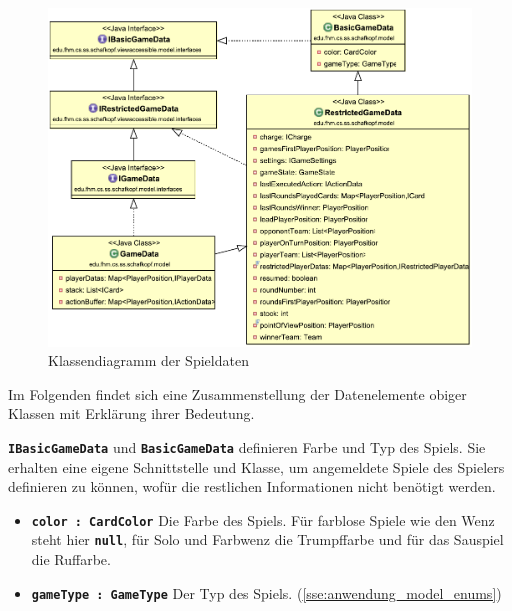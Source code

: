 \documentclass[
							a4paper, 
							11pt, 
							openany, 
							liststotoc,
							parskip=half, 
   							headings=normal
						]{scrreprt}
\begin{document}
{\begin{figure}[H]
\begin{center}
    \includegraphics[width=1.0\textwidth]{./pictures/uml/class_diagram/uml_class_gamedata.pdf}
	\caption[Anwendung/Model -- Klassendiagramm Spieldaten]{Klassendiagramm der Spieldaten} \label{fig:model_gamedata}
\end{center}
\end{figure}

Im Folgenden findet sich eine Zusammenstellung der Datenelemente obiger Klassen mit Erklärung ihrer Bedeutung.

\textbf{\texttt{IBasicGameData}} und \textbf{\texttt{BasicGameData}} definieren Farbe und Typ des Spiels. Sie erhalten eine eigene Schnittstelle und Klasse, um angemeldete Spiele des Spielers definieren zu können, wofür die restlichen Informationen nicht benötigt werden.
\begin{itemize}
	\item \textbf{\texttt{color : CardColor}} Die Farbe des Spiels. Für farblose Spiele wie den Wenz steht hier \textbf{\texttt{null}}, für Solo und Farbwenz die Trumpffarbe und für das Sauspiel die Ruffarbe.
	\item \textbf{\texttt{gameType : GameType}} Der Typ des Spiels. (\autoref{sse:anwendung_model_enums})
\end{itemize}\bigskip

}
\end{document}

